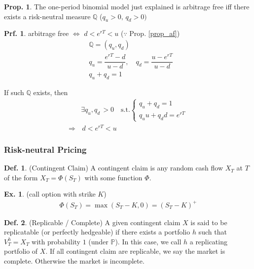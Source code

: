 \documentclass[a4paper,11pt]{jsarticle}
\theoremstyle{definition}
\newtheorem{definition}{Def.}[subsection]
\newtheorem{prf}{Prf.}[subsection]
\newtheorem{prop}{Prop.}[subsection]
\newtheorem{ex}{Ex.}[subsection]
\newcommand{\df}[2]{\dfrac{#1}{#2}}
\begin{document}
\begin{prop}
  The one-period binomial model just explained is arbitrage
  free iff there exists a risk-neutral measure
  $\mathbb{Q}$ ($q_u>0,\, q_d>0)$
\end{prop}

\begin{prf}
  arbitrage free $\Leftrightarrow$ $d<e^{rT}<u$
  ($\because$ Prop. \ref{prop_af}) \\
  \begin{align}
    &\mathbb{Q}=(q_u,q_d) \\
    &q_u=\df{e^{rT}-d}{u-d} , \quad
    q_d=\df{u-e^{rT}}{u-d} \\
    &q_u+q_d=1
  \end{align}

  If such $\mathbb{Q}$ exists, then
  \begin{align}
    & \exists q_u,q_d \, >0 \quad \mbox{s.t.}
    \begin{cases}
      q_u+q_d=1 \\
      q_u u + q_d d =e^{rT}
    \end{cases} \\
    \Rightarrow & \, d<e^{rT}<u
  \end{align}
\end{prf}

\subsubsection{Risk-neutral Pricing}
\begin{definition}{(Contingent Claim)}
  A contingent claim is any random cash flow $X_T$ at $T$
  of the form $X_T=\Phi(S_T)$ with some function $\Phi$.

  \begin{ex}{(call option with strike $K$)}
    \begin{align}
      \Phi(S_T)=\max(S_T-K,0)=(S_T-K)^{+}
    \end{align}
  \end{ex}
\end{definition}

\begin{definition}{(Replicable / Complete)}
  A given contingent claim $X$ is said to be replicatable
  (or perfectly hedgeable) if there exists a portfolio $h$
  such that $V_T^h=X_T$ with probability $1$ (under $\mathbb{P}$).
  In this case, we call $h$ a replicating portfolio of $X$.
  If all contingent claim are replicable, we say
  the market is complete. Otherwise the market is incomplete.
\end{definition}
\end{document}
